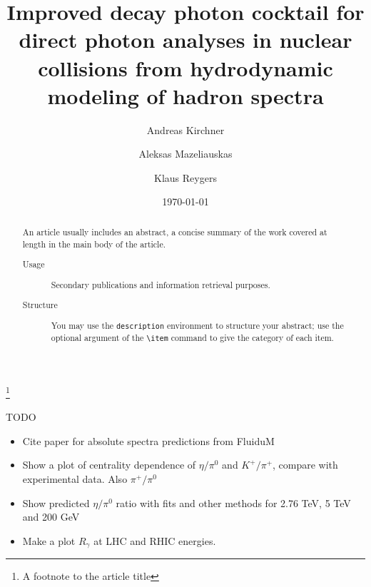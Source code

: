 \documentclass[%
 reprint,
 amsmath,amssymb,
 aps,
prc,
]{revtex4-2}
\begin{document}
\title{Improved decay
photon cocktail for direct photon analyses in nuclear collisions from hydrodynamic modeling of hadron spectra}%
\thanks{A footnote to the article title}%

\author{Andreas Kirchner}
\author{Aleksas Mazeliauskas}%
\author{Klaus Reygers}%


\date{\today}%

\begin{abstract}
An article usually includes an abstract, a concise summary of the work
covered at length in the main body of the article. 
\begin{description}
\item[Usage]
Secondary publications and information retrieval purposes.
\item[Structure]
You may use the \texttt{description} environment to structure your abstract;
use the optional argument of the \verb+\item+ command to give the category of each item. 
\end{description}
\end{abstract}

\maketitle



TODO
\begin{itemize}
\item Cite paper for absolute spectra predictions from FluiduM
\item Show a plot of centrality dependence of $\eta/\pi^0$ and $K^+/\pi^+$, compare with experimental data. Also $\pi^+/\pi^0$
\item Show predicted $\eta/\pi^0$ ratio with fits and other methods for 2.76 TeV, 5 TeV and 200 GeV
\item Make a plot $R_\gamma$ at LHC and RHIC energies.
\end{itemize}
\end{document}
